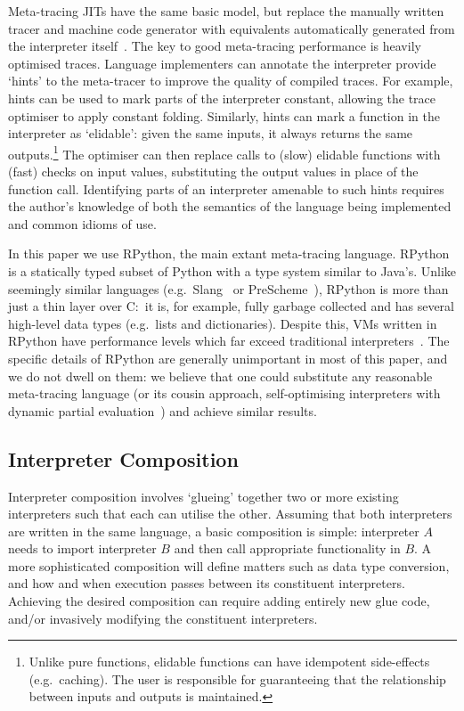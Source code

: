 \documentclass[a4paper,UKenglish]{lipics-v2016}
\begin{document}
Meta-tracing JITs have the same basic model, but replace the manually written
tracer and machine code generator with equivalents automatically generated
from the interpreter itself~\cite{mitchell70design,sullivan03dynamic,yermolovich09optimization,bebenita10spur,bolz14impact}. The key to good meta-tracing performance is heavily optimised traces. Language
implementers can annotate the interpreter provide `hints' to the meta-tracer to improve the quality of
compiled traces. For example, hints can be used to mark parts of the
interpreter constant, allowing the trace optimiser to apply constant folding.
\label{elidable functions} Similarly, hints can
mark a function in the interpreter as `elidable': given the
same inputs, it always returns the same outputs.\footnote{Unlike pure functions,
elidable functions can have idempotent side-effects (e.g.~caching). The user
is responsible for guaranteeing that the relationship between inputs and outputs is maintained.}
The optimiser can then
replace calls to (slow) elidable functions with (fast) checks on input
values, substituting the output values in place of the function call.
Identifying parts of an interpreter amenable to such hints requires the author's
knowledge of both the semantics of the language being implemented and common
idioms of use.

In this paper we use RPython, the main extant meta-tracing language. RPython
is a statically typed subset of Python with a type system similar to Java's.
Unlike seemingly similar languages
(e.g.~Slang~\cite{ingalls97back} or PreScheme~\cite{kelsey94tractable}), RPython
is more than just a thin layer over C:~it is, for example, fully garbage
collected and has several high-level data types (e.g.~lists and dictionaries).
Despite this, VMs written in RPython have performance levels which far exceed
traditional interpreters~\cite{bolz14impact}.
The specific details
of RPython are generally unimportant in most of this paper, and we do not
dwell on them: we believe that one could substitute any reasonable
meta-tracing language (or its cousin approach, self-optimising interpreters with dynamic partial
evaluation~\cite{wuerthinger13onevm}) and achieve similar results.


\subsection{Interpreter Composition}

Interpreter composition involves `glueing' together two or more existing
interpreters such that each can utilise the other. Assuming that both
interpreters are written in the same language, a basic composition
is simple: interpreter $A$ needs to import interpreter $B$ and then call
appropriate functionality in $B$. A more sophisticated composition will define
matters such as data type conversion, and how and when execution passes between
its constituent interpreters. Achieving the desired composition can require
adding entirely new glue code,
and/or invasively modifying the constituent interpreters.
\end{document}
